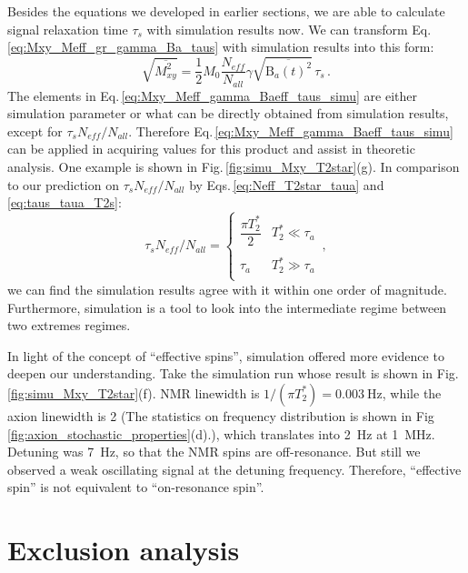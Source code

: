 Besides the equations we developed in earlier sections, we are able to calculate signal relaxation time $\tau_s$ with simulation results now. We can transform Eq.\,\eqref{eq:Mxy_Meff_gr_gamma_Ba_taus} with simulation results into this form:
\begin{equation}
    \sqrt{\overline{M_{xy}^2}} = \dfrac{1}{2} M_0 \dfrac{N_{eff}}{N_{all}} \gamma \sqrt{\overline{\mathrm{B}_{a}(t)^2}}\,   \tau_s 
    \,.\label{eq:Mxy_Meff_gamma_Baeff_taus_simu}
\end{equation}
The elements in Eq.\,\eqref{eq:Mxy_Meff_gamma_Baeff_taus_simu} are either simulation parameter or what can be directly obtained from simulation results, except for $\tau_s N_{eff}/N_{all}$. Therefore Eq.\,\eqref{eq:Mxy_Meff_gamma_Baeff_taus_simu} can be applied in acquiring values for this product and assist in theoretic analysis. One example is shown in Fig.\,\ref{fig:simu_Mxy_T2star}(g). In comparison to our prediction on $\tau_s N_{eff}/N_{all}$ by Eqs.\,\eqref{eq:Neff_T2star_taua} and \eqref{eq:taus_taua_T2s}:
\begin{equation}
     \tau_s N_{eff}/N_{all}  = \left\{
    \begin{array}{cl}
    \dfrac{\pi T_2^*}{2}  &  T_2^* \ll \tau_a\\
     & \\
    \tau_a  & T_2^* \gg \tau_a\\
    \end{array} \right.\,,%
\end{equation}
we can find the simulation results agree with it within one order of magnitude. Furthermore, simulation is a tool to look into the intermediate regime between two extremes regimes. 

In light of the concept of ``effective spins'', simulation offered more evidence to deepen our understanding. Take the simulation run whose result is shown in Fig.\,\ref{fig:simu_Mxy_T2star}(f). NMR linewidth is $1/(\pi T_2^*) = \SI{0.003}{\Hz}$, while the axion linewidth is \SI{2}{\ppm} (The statistics on frequency distribution is shown in Fig\,\ref{fig:axion_stochastic_properties}(d).), which translates into \SI{2}{\Hz} at \SI{1}{\MHz}. Detuning was \SI{7}{\Hz}, so that the NMR spins are off-resonance. But still we observed a weak oscillating signal at the detuning frequency. Therefore, ``effective spin'' is not equivalent to ``on-resonance spin''. 

\section{Exclusion analysis}\label{sec:Exclusion_analysis}

